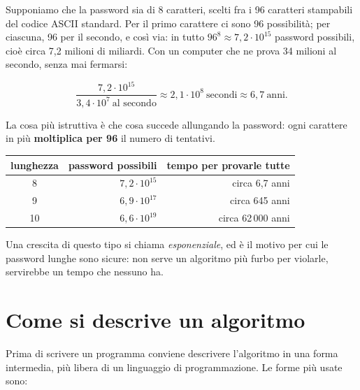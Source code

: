 Supponiamo che la password sia di 8 caratteri, scelti fra i 96 caratteri
stampabili del codice ASCII standard. Per il primo carattere ci sono 96
possibilità; per ciascuna, 96 per il secondo, e così via: in tutto
$96^8 \approx 7{,}2 \cdot 10^{15}$ password possibili, cioè circa 7,2
milioni di miliardi. Con un computer che ne prova 34 milioni al secondo,
senza mai fermarsi:

\[
  \frac{7{,}2 \cdot 10^{15}}{3{,}4 \cdot 10^{7}\ \text{al secondo}}
  \approx 2{,}1 \cdot 10^{8}\ \text{secondi} \approx 6{,}7\ \text{anni}.
\]


La cosa più istruttiva è che cosa succede allungando la password: ogni
carattere in più \textbf{moltiplica per 96} il numero di tentativi.

\begin{center}
\renewcommand{\arraystretch}{1.3}
\begin{tabular}{@{}crr@{}}
  \toprule
  \textbf{lunghezza} & \textbf{password possibili} & \textbf{tempo per provarle tutte} \\
  \midrule
  8  & $7{,}2 \cdot 10^{15}$ & circa 6,7 anni \\
  9  & $6{,}9 \cdot 10^{17}$ & circa 645 anni \\
  10 & $6{,}6 \cdot 10^{19}$ & circa 62\,000 anni \\
  \bottomrule
\end{tabular}
\end{center}

Una crescita di questo tipo si chiama \textit{esponenziale}, ed è il motivo
per cui le password lunghe sono sicure: non serve un algoritmo più furbo per
violarle, servirebbe un tempo che nessuno ha.

\section{Come si descrive un algoritmo}

Prima di scrivere un programma conviene descrivere l'algoritmo in una forma
intermedia, più libera di un linguaggio di programmazione. Le forme più
usate sono:

